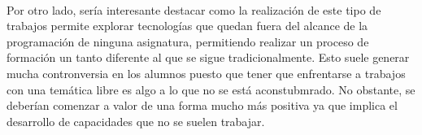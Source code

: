 \documentclass[12pt, a4paper]{article}
\begin{document}
        \paragraph{}
        Por otro lado, sería interesante destacar como la realización de este tipo de trabajos permite explorar tecnologías que quedan fuera del alcance de la programación de ninguna asignatura, permitiendo realizar un proceso de formación un tanto diferente al que se sigue tradicionalmente. Esto suele generar mucha contronversia en los alumnos puesto que tener que enfrentarse a trabajos con una temática libre es algo a lo que no se está aconstubmrado. No obstante, se deberían comenzar a valor de una forma mucho más positiva ya que implica el desarrollo de capacidades que no se suelen trabajar.

        \clearpage
        
        
    
\end{document}
